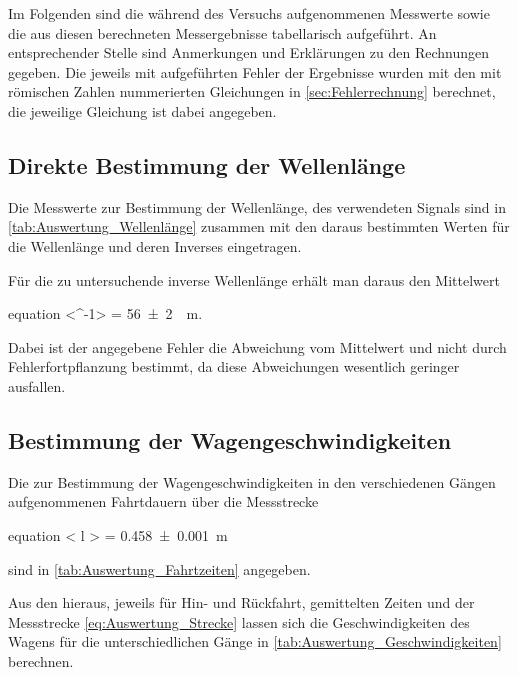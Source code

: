 Im Folgenden sind die während des Versuchs aufgenommenen Messwerte sowie
die aus diesen berechneten Messergebnisse tabellarisch aufgeführt. An 
entsprechender Stelle sind Anmerkungen und Erklärungen zu den 
Rechnungen gegeben. Die jeweils mit aufgeführten Fehler der Ergebnisse 
wurden mit den mit römischen Zahlen nummerierten Gleichungen in \cref{sec:Fehlerrechnung}
berechnet, die jeweilige Gleichung ist dabei angegeben.

\subsection{Direkte Bestimmung der Wellenlänge}
	
	Die Messwerte zur Bestimmung der Wellenlänge, des verwendeten Signals 
	sind in \cref{tab:Auswertung_Wellenlänge} zusammen mit den daraus bestimmten Werten für die Wellenlänge
	und deren Inverses eingetragen.
	
	   
	
	Für die zu untersuchende inverse Wellenlänge erhält man daraus den Mittelwert
	\begin{empheq}{equation}
		\label{eq:Auswertung_Wellenlaenge_direkt}
		\left<\lambda^{-1}\right> = \SI{56(2)}{\per\meter}.
	\end{empheq}
	Dabei ist der angegebene Fehler
	die Abweichung vom Mittelwert und nicht durch Fehlerfortpflanzung bestimmt, da
	diese Abweichungen wesentlich geringer ausfallen.
	 
\subsection{Bestimmung der Wagengeschwindigkeiten}

	Die zur Bestimmung der Wagengeschwindigkeiten in den verschiedenen Gängen
	aufgenommenen Fahrtdauern über die Messstrecke 
	\begin{empheq}{equation}
		\label{eq:Auswertung_Strecke}
		\left< l \right> = \SI{0.458(1)}{\meter}
	\end{empheq}
	sind in \cref{tab:Auswertung_Fahrtzeiten} angegeben.
	
	
	
	Aus den hieraus, jeweils für Hin- und Rückfahrt, gemittelten Zeiten und der 
	Messstrecke \cref{eq:Auswertung_Strecke} lassen sich die Geschwindigkeiten 
	des Wagens für die unterschiedlichen Gänge in \cref{tab:Auswertung_Geschwindigkeiten} 
	berechnen.
	
